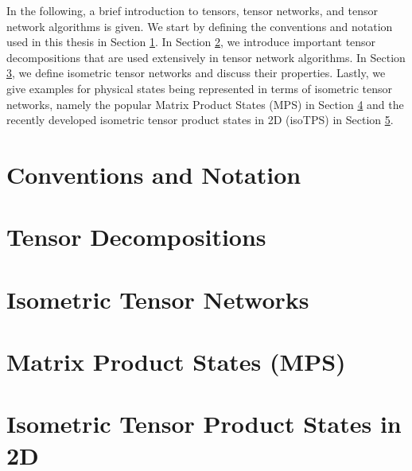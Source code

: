 In the following, a brief introduction to tensors, tensor networks, and tensor network algorithms is given. We start by defining the conventions and notation used in this thesis in Section \ref{sec:tensors_and_tensor_networks_conventions_and_notation}. In Section \ref{sec:tensors_and_tensor_networks_tensor_decompositions}, we introduce important tensor decompositions that are used extensively in tensor network algorithms. In Section \ref{sec:tensors_and_tensor_networks_isometric_tensor_networks}, we define isometric tensor networks and discuss their properties. Lastly, we give examples for physical states being represented in terms of isometric tensor networks, namely the popular Matrix Product States (MPS) in Section \ref{sec:tensors_and_tensor_networks_matrix_product_states} and the recently developed isometric tensor product states in 2D (isoTPS) in Section \ref{sec:tensors_and_tensor_networks_isometric_tensor_product_states_in_2D}.

\section{Conventions and Notation}
\label{sec:tensors_and_tensor_networks_conventions_and_notation}


\newpage
\section{Tensor Decompositions}
\label{sec:tensors_and_tensor_networks_tensor_decompositions}


\section{Isometric Tensor Networks}
\label{sec:tensors_and_tensor_networks_isometric_tensor_networks}


\newpage
\section{Matrix Product States (MPS)}
\label{sec:tensors_and_tensor_networks_matrix_product_states}


\section{Isometric Tensor Product States in 2D}
\label{sec:tensors_and_tensor_networks_isometric_tensor_product_states_in_2D}
